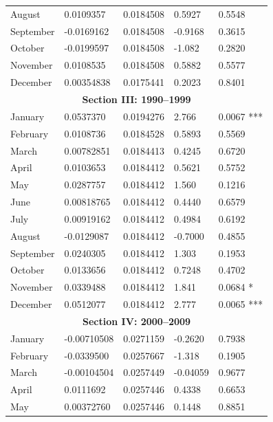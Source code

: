 \documentclass[11pt, english]{article}
\begin{document}
\begin{center}
\begin{longtable}{p{2cm}p{2cm}p{2cm}p{2cm}p{2cm}}
                August & 0.0109357 & 0.0184508 & 0.5927 & 0.5548\\
                September & -0.0169162 & 0.0184508 & -0.9168 & 0.3615\\
                October & -0.0199597 & 0.0184508 & -1.082 & 0.2820\\
                November & 0.0108535 & 0.0184508 & 0.5882 & 0.5577\\
                December & 0.00354838 & 0.0175441 & 0.2023 & 0.8401\\
                \hline
		\multicolumn{5}{c}{\textbf{Section III: 1990--1999}}\\ 
                \hline
                January & 0.0537370 & 0.0194276 & 2.766 & 0.0067 ***\\
                February & 0.0108736 & 0.0184528 & 0.5893 & 0.5569\\    
                March & 0.00782851 & 0.0184413 & 0.4245 & 0.6720\\
                April & 0.0103653 & 0.0184412 & 0.5621 & 0.5752\\
                May & 0.0287757 & 0.0184412 & 1.560 & 0.1216\\
                June & 0.00818765 & 0.0184412 & 0.4440 & 0.6579\\
                July & 0.00919162 & 0.0184412 & 0.4984 & 0.6192\\
                August & -0.0129087 & 0.0184412 & -0.7000 & 0.4855\\
                September & 0.0240305 & 0.0184412 & 1.303 & 0.1953\\
                October & 0.0133656 & 0.0184412 & 0.7248 & 0.4702\\
                November & 0.0339488 & 0.0184412 & 1.841 & 0.0684 *\\
                December & 0.0512077 & 0.0184412 & 2.777 & 0.0065 ***\\
                \hline
                \multicolumn{5}{c}{\textbf{Section IV: 2000--2009}}\\
                \hline
                January & -0.00710508 & 0.0271159 & -0.2620 & 0.7938\\
                February & -0.0339500 & 0.0257667 & -1.318 & 0.1905\\
                March & -0.00104504 & 0.0257449 & -0.04059 & 0.9677\\
                April & 0.0111692 & 0.0257446 & 0.4338 & 0.6653\\
                May & 0.00372760 & 0.0257446 & 0.1448 & 0.8851\\

\end{longtable}
\end{center}
\end{document}
